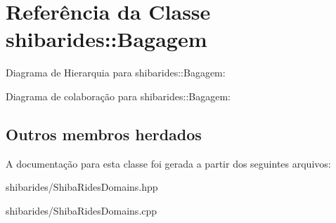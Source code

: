 \hypertarget{classshibarides_1_1Bagagem}{}\section{Referência da Classe shibarides\+:\+:Bagagem}
\label{classshibarides_1_1Bagagem}


Diagrama de Hierarquia para shibarides\+:\+:Bagagem\+:


Diagrama de colaboração para shibarides\+:\+:Bagagem\+:
\subsection*{Outros membros herdados}


A documentação para esta classe foi gerada a partir dos seguintes arquivos\+:\begin{DoxyCompactItemize}
\item 
shibarides/Shiba\+Rides\+Domains.\+hpp\item 
shibarides/Shiba\+Rides\+Domains.\+cpp\end{DoxyCompactItemize}
